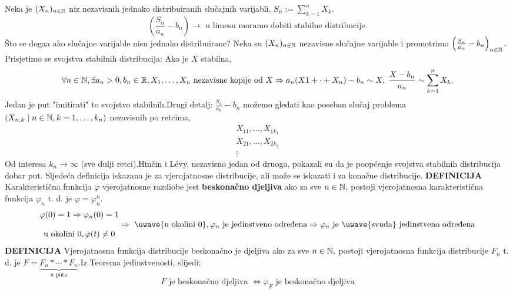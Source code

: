 \documentclass{article}
\begin{document}
Neka je \((X_n)_{n\in\Bbb N}\) niz nezavisnih jednako distribuiranih slučajnih varijabli, \(S_n:=\sum_{k=1}^nX_k.\) \[\left(\frac{S_n}{a_n}-b_n\right)\longrightarrow\text{ u limesu moramo dobiti stabilne distribucije}.\] Što se doga\dj{}a ako slučajne varijable nisu jednako distribuirane? Neka su \((X_n)_{n\in\Bbb N}\) nezavisne slučajne varijable i promotrimo \(\left(\frac{S_n}{a_n}-b_n\right)_{n\in\Bbb N}.\) Prisjetimo se svojstva stabilnih distribucija: Ako je \(X\) stabilna, \[\forall n\in\Bbb N,\exists a_n>0,b_n\in\Bbb R,X_1,\ldots,X_n\text{ nezavisne kopije od }X\Rightarrow a_n(X1+\cdot+X_n)-b_n\sim X,\;\frac{X-b_n}{a_n}\sim\sum_{k=1}^nX_k.\] Jedan je put "imitirati" to svojstvo stabilnih.\newline Drugi detalj: \(\frac{S_n}{a_n}-b_n\) možemo gledati kao poseban slučaj problema \((X_{n,k}\mid n\in\Bbb N,k=1,\ldots,k_n)\) nezavisnih po retcima, \[\begin{matrix}X_{11},\ldots,X_{1k_1}\\X_{21},\ldots,X_{2k_2}\\\vdots\end{matrix}\] Od interesa \(k_n\to\infty\) (sve dulji retci).\newline Hinčin i L\'evy, nezavisno jedan od druoga, pokazali su da je poopćenje svojstva stabilnih distribucija dobar put.\newline 
Sljedeća definicija iskazana je za vjerojatnosne distribucije, ali može se iskazati i za konačne distribucije.\newline
\textbf{DEFINICIJA}\newline
Karakteristična funkcija \(\varphi\) vjerojatnosne razdiobe jest \textbf{beskonačno djeljiva} ako za sve \(n\in\Bbb N,\) postoji vjerojatnosna karakteristična funkcija \(\varphi_n\) t. d. je \(\varphi=\varphi_n^n.\) \[\begin{matrix}\varphi(0)=1\Rightarrow\varphi_n(0)=1\\\\\text{u okolini }0,\varphi(t)\ne0\end{matrix}\Rightarrow\text{ \uwave{u okolini \(0\)}},\varphi_n\text{ je jedinstveno odre\dj{}ena}\Rightarrow\varphi_n\text{ je \uwave{svuda} jedinstveno odre\dj{}ena}\]
\textbf{DEFINICIJA}\newline
Vjerojatnosna funkcija distribucije beskonačno je djeljiva ako za sve \(n\in\Bbb N,\) postoji vjerojatnosna funkcija distribucije \(F_n\) t. d. je \(F=\underbrace{F_n\ast\cdots\ast F_n}_{n\text{ puta}}.\)\newline Iz Teorema jedinstvenosti, slijedi: \[F\text{ je beskonačno djeljiva }\Leftrightarrow\varphi_F\text{ je beskonačno djeljiva}\]
\end{document}
